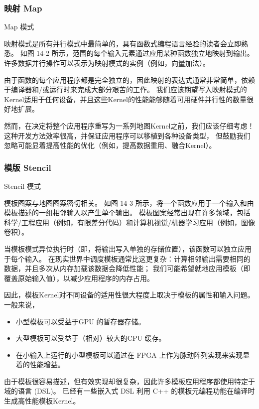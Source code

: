 \subsubsection{映射 Map}
{\color{red} Map 模式}

映射模式是所有并行模式中最简单的，具有函数式编程语言经验的读者会立即熟悉。 
如图 14-2 所示，范围的每个输入元素通过应用某种函数独立地映射到输出。 
许多数据并行操作可以表示为映射模式的实例（例如，向量加法）。

由于函数的每个应用程序都是完全独立的，因此映射的表达式通常非常简单，依赖于编译器和/或运行时来完成大部分艰苦的工作。 
我们应该期望写入映射模式的Kernel适用于任何设备，并且这些Kernel的性能能够随着可用硬件并行性的数量很好地扩展。

然而，在决定将整个应用程序重写为一系列地图Kernel之前，我们应该仔细考虑！ 
这种开发方法效率很高，并保证应用程序可以移植到各种设备类型，
但鼓励我们忽略可能显着提高性能的优化（例如，提高数据重用、融合Kernel）。

\subsubsection{模版 Stencil}
{\color{red} Stencil 模式}

模板图案与地图图案密切相关。 如图 14-3 所示，将一个函数应用于一个输入和由模板描述的一组相邻输入以产生单个输出。 
模板图案经常出现在许多领域，包括科学/工程应用（例如，有限差分代码）和计算机视觉/机器学习应用（例如，图像卷积）。

当模板模式异位执行时（即，将输出写入单独的存储位置），该函数可以独立应用于每个输入。 
在现实世界中调度模板通常比这更复杂：计算相邻输出需要相同的数据，并且多次从内存加载该数据会降低性能； 
我们可能希望就地应用模板（即覆盖原始输入值），以减少应用程序的内存占用。

因此，模板Kernel对不同设备的适用性很大程度上取决于模板的属性和输入问题。 一般来说，

\begin{itemize}
	\item 小型模板可以受益于GPU 的暂存器存储。

	\item 大型模板可以受益于（相对）较大的CPU 缓存。

	\item 在小输入上运行的小型模板可以通过在 FPGA 上作为脉动阵列实现来实现显着的性能增益。
\end{itemize}

由于模板很容易描述，但有效实现却很复杂，因此许多模板应用程序都使用特定于域的语言 (DSL)。 
已经有一些嵌入式 DSL 利用 C++ 的模板元编程功能在编译时生成高性能模板Kernel。

